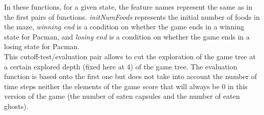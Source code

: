 \documentclass{article}
\begin{document}
\begin{enumerate}[label=\alph*.,leftmargin=*]
\begin{itemize}
\begin{itemize}
					In these functions, for a given state, the feature names represent the same as in the first pairs of functions. \textit{initNumFoods} represents the initial number of foods in the maze, \textit{winning end} is a condition on whether the game ends in a winning state for Pacman, and \textit{losing end} is a condition on whether the game ends in a losing state for Pacman.\\
				
					This cutoff-test/evaluation pair allows to cut the exploration of the game tree at a certain explored depth (fixed here at 4) of the game tree. The evaluation function is based onto the first one but does not take into account the number of time steps neither the elements of the game score that will always be 0 in this version of the game (the number of eaten capsules and the number of eaten ghosts).\\
				\end{itemize}
		\end{itemize}
\end{enumerate}
\end{document}

